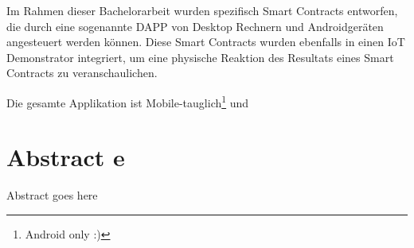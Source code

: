 Im Rahmen dieser Bachelorarbeit wurden spezifisch Smart Contracts entworfen, die durch eine sogenannte \acrfull{DAPP} von Desktop Rechnern und Androidgeräten angesteuert werden können. Diese Smart Contracts wurden ebenfalls in einen IoT Demonstrator integriert, um eine physische Reaktion des Resultats eines Smart Contracts zu veranschaulichen.

Die gesamte Applikation ist Mobile-tauglich\footnote{Android only :)} und 




\chapter{Abstract e}
\label{cha:abstract_e}

Abstract goes here

